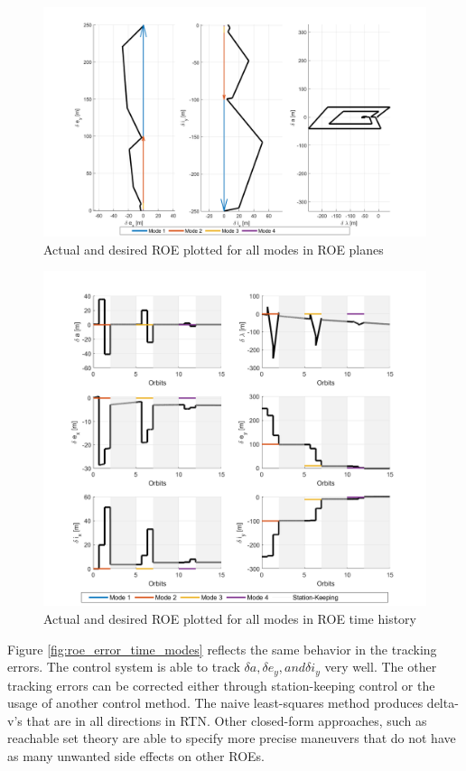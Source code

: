 \begin{figure}[H]
    \centering
    \includegraphics[width=0.75\linewidth]{sim/figures/PS5/ROE_planes_modes.png}
    \caption{Actual and desired ROE plotted for all modes in ROE planes}
    \label{fig:roe_planes_modes}
\end{figure}
\begin{figure}[H]
    \centering
    \includegraphics[width=0.75\linewidth]{sim/figures/PS5/ROE_over_time_modes.png}
    \caption{Actual and desired ROE plotted for all modes in ROE time history}
    \label{fig:roe_time_modes}
\end{figure}

Figure \ref{fig:roe_error_time_modes} reflects the same behavior in the tracking errors. The control system is able to track $\delta a, \delta e_y, and \delta i_y$ very well. The other tracking errors can be corrected either through station-keeping control or the usage of another control method. The naive least-squares method produces delta-v's that are in all directions in RTN. Other closed-form approaches, such as reachable set theory are able to specify more precise maneuvers that do not have as many unwanted side effects on other ROEs. 

